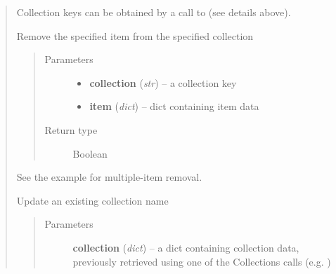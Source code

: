\documentclass[letterpaper,10pt,english]{sphinxmanual}
\begin{document}
\begin{quote}
\begin{fulllineitems}
\begin{quote}
\begin{description}
\end{description}\end{quote}

Collection keys can be obtained by a call to {\hyperref[index:pyzotero.zotero.Zotero.collections]{}} (see details above).

\end{fulllineitems}



\begin{fulllineitems}
\label{index:pyzotero.zotero.Zotero.deletefrom_collection}
Remove the specified item from the specified collection
\begin{quote}\begin{description}
\item[{Parameters}] \leavevmode\begin{itemize}
\item {} 
\textbf{collection} (\emph{str}) -- a collection key

\item {} 
\textbf{item} (\emph{dict}) -- dict containing item data

\end{itemize}

\item[{Return type}] \leavevmode
Boolean

\end{description}\end{quote}

See the {\hyperref[index:pyzotero.zotero.Zotero.delete_item]{}} example for multiple-item removal.

\end{fulllineitems}



\begin{fulllineitems}
\label{index:pyzotero.zotero.Zotero.update_collection}
Update an existing collection name
\begin{quote}\begin{description}
\item[{Parameters}] \leavevmode
\textbf{collection} (\emph{dict}) -- a dict containing collection data, previously retrieved using one of the Collections calls (e.g. {\hyperref[index:pyzotero.zotero.Zotero.collections]{}})


\end{description}
\end{quote}
\end{fulllineitems}
\end{quote}
\end{document}
